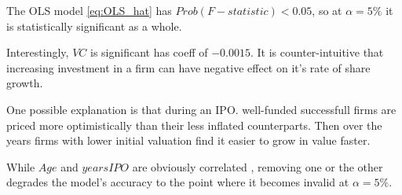 The OLS model \ref{eq:OLS_hat} has $Prob(F-statistic) < 0.05$, so at $\alpha = 5\%$ it is statistically significant as a whole.

Interestingly, $VC$ is significant has coeff of $-0.0015$. It is counter-intuitive that increasing investment in a firm can have negative effect on it's rate of share growth.

One possible explanation is that during an IPO.  well-funded successfull firms are priced more optimistically than their less inflated counterparts. Then over the years firms with lower initial valuation find it easier to grow in value faster.

While $Age$ and $yearsIPO$ are obviously correlated , removing one or the other degrades the model's accuracy to the point where it becomes invalid at $\alpha = 5\%$.